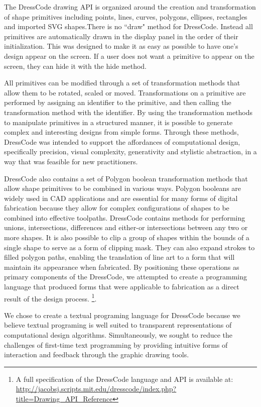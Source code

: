 \documentclass{sigchi}
\begin{document}
The DressCode drawing API is organized around the creation and transformation of shape primitives including points, lines, curves, polygons, ellipses, rectangles and imported SVG shapes.There is no ``draw" method for DressCode. Instead all primitives are automatically drawn in the display panel in the order of their initialization. This was designed to make it as easy as possible to have one's design appear on the screen. If a user does not want a primitive to appear on the screen, they can hide it with the hide method. 
 
 All primitives can be modified through a set of transformation methods that allow them to be rotated, scaled or moved. Transformations on a primitive are performed by assigning an identifier to the primitive, and then calling the transformation method with the identifier. By using the transformation methods to manipulate primitives in a structured manner, it is possible to generate complex and interesting designs from simple forms. Through these methods, DressCode was intended to support the affordances of computational design, specifically precision, visual complexity, generativity and stylistic abstraction, in a way that was feasible for new practitioners.

DressCode also contains a set of Polygon boolean transformation methods that allow shape primitives to be combined in various ways. Polygon booleans are widely used in CAD applications and are essential for many forms of digital fabrication because they allow for complex configurations of shapes to be combined into effective toolpaths. DressCode contains methods for performing unions, intersections, differences and either-or intersections between any two or more shapes. It is also possible to clip a group of shapes within the bounds of a single shape to serve as a form of clipping mask. They can also expand strokes to filled polygon paths, enabling the translation of line art to a form that will maintain its appearance when fabricated. By positioning these operations as primary components of the DressCode, we attempted to create a programming language that produced forms that were applicable to fabrication as a direct result of the design process. 
 \footnote{A full specification of the DressCode language and API is available at: \url{http://jacobsj.scripts.mit.edu/dresscode/index.php?title=Drawing_API_Reference}}. 

We chose to create a textual programing language for DressCode because we believe textual programing is well suited to transparent representations of computational design algorithms. Simultaneously, we sought to reduce the challenges of first-time text programming by providing intuitive forms of interaction and feedback through the graphic drawing tools. 
\end{document}
